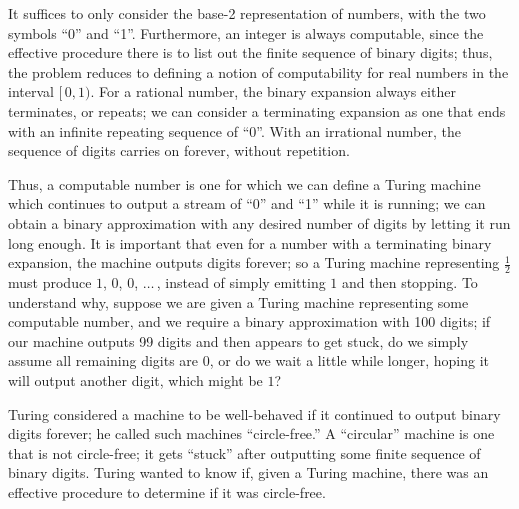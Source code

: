 \documentclass[../generics]{subfiles}
\begin{document}
It suffices to only consider the base-2 representation of numbers, with the two symbols ``0'' and ``1''. Furthermore, an integer is always computable, since the effective procedure there is to list out the finite sequence of binary digits; thus, the problem reduces to defining a notion of computability for real numbers in the interval $[\,0, 1)$. For a rational number, the binary expansion always either terminates, or repeats; we can consider a terminating expansion as one that ends with an infinite repeating sequence of ``0''. With an irrational number, the sequence of digits carries on forever, without repetition.

Thus, a computable number is one for which we can define a Turing machine which continues to output a stream of ``0'' and ``1'' while it is running; we can obtain a binary approximation with any desired number of digits by letting it run long enough. It is important that even for a number with a terminating binary expansion, the machine outputs digits forever; so a Turing machine representing $\frac{1}{2}$ must produce $1$, $0$, $0$, $\ldots$\,, instead of simply emitting $1$ and then stopping. To understand why, suppose we are given a Turing machine representing some computable number, and we require a binary approximation with 100 digits; if our machine outputs 99 digits and then appears to get stuck, do we simply assume all remaining digits are 0, or do we wait a little while longer, hoping it will output another digit, which might be $1$?

Turing considered a machine to be well-behaved if it continued to output binary digits forever; he called such machines ``circle-free.'' A ``circular'' machine is one that is not circle-free; it gets ``stuck'' after outputting some finite sequence of binary digits. Turing wanted to know if, given a Turing machine, there was an effective procedure to determine if it was circle-free.
\end{document}
